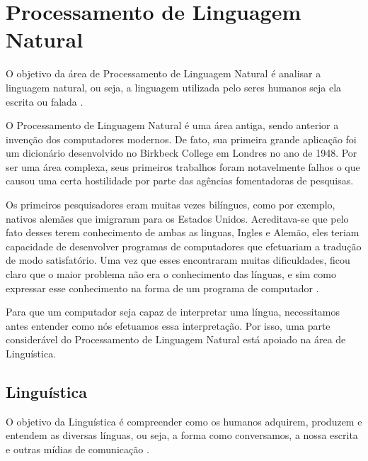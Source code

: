 \chapter{Processamento de Linguagem Natural}
\label{cap:Processamento}


O objetivo da área de Processamento de Linguagem Natural é analisar a linguagem
natural, ou seja, a linguagem utilizada pelo seres humanos seja ela escrita
ou falada \cite{manningschutze1999}.

O Processamento de Linguagem Natural é uma área antiga, sendo anterior a
invenção dos computadores modernos. De fato, sua primeira grande aplicação foi
um dicionário desenvolvido no Birkbeck College em Londres no ano de 1948. Por ser
uma área complexa, seus primeiros trabalhos foram notavelmente falhos o que
causou uma certa hostilidade por parte das agências fomentadoras de pesquisas.

Os primeiros pesquisadores eram muitas vezes bilíngues, como por exemplo,
nativos alemães que imigraram para os Estados Unidos. Acreditava-se que pelo
fato desses terem conhecimento de ambas as linguas, Ingles e Alemão, eles teriam
capacidade de desenvolver programas de computadores que efetuariam a tradução
de modo satisfatório. Uma vez que esses encontraram muitas dificuldades,
ficou claro que o maior problema não era o conhecimento das
línguas, e sim como expressar esse conhecimento na forma de um programa de
computador \cite{history}.

Para que um computador seja capaz de interpretar uma
língua, necessitamos antes entender como nós efetuamos essa
interpretação.
Por isso, uma parte considerável do Processamento de Linguagem Natural está apoiado na área de Linguística.

\section{Linguística}

O objetivo da Linguística é compreender como os humanos adquirem, produzem e
entendem as diversas línguas, ou seja, a forma como conversamos, a nossa
escrita e outras mídias de comunicação \cite{manningschutze1999}.


